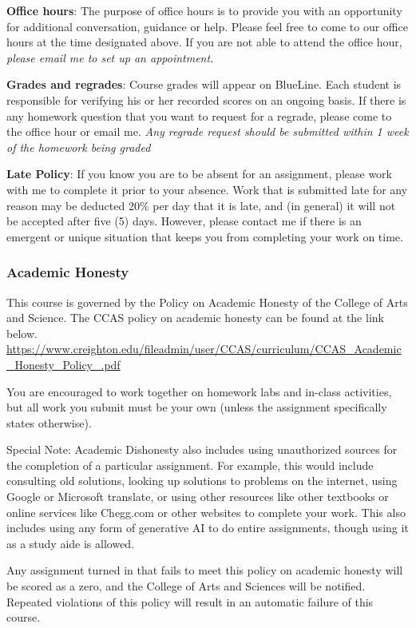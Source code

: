 \documentclass[
  11pt,
  letterpaper,
  DIV=11,
  numbers=noendperiod]{scrartcl}
\begin{document}
\textbf{Office hours}: The purpose of office hours is to provide you
with an opportunity for additional conversation, guidance or help.
Please feel free to come to our office hours at the time designated
above. If you are not able to attend the office hour, \emph{please email
me to set up an appointment}.

\textbf{Grades and regrades}: Course grades will appear on BlueLine.
Each student is responsible for verifying his or her recorded scores on
an ongoing basis. If there is any homework question that you want to
request for a regrade, please come to the office hour or email me.
\emph{Any regrade request should be submitted within 1 week of the
homework being graded}

\textbf{Late Policy}: If you know you are to be absent for an
assignment, please work with me to complete it prior to your absence.
Work that is submitted late for any reason may be deducted 20\% per day
that it is late, and (in general) it will not be accepted after five (5)
days. However, please contact me if there is an emergent or unique
situation that keeps you from completing your work on time.

\subsubsection{Academic Honesty}\label{academic-honesty}

This course is governed by the Policy on Academic Honesty of the College
of Arts and Science. The CCAS policy on academic honesty can be found at
the link below.
\url{https://www.creighton.edu/fileadmin/user/CCAS/curriculum/CCAS\_Academic\_Honesty\_Policy\_.pdf}

You are encouraged to work together on homework labs and in-class
activities, but all work you submit must be your own (unless the
assignment specifically states otherwise).

Special Note: Academic Dishonesty also includes using unauthorized
sources for the completion of a particular assignment. For example, this
would include consulting old solutions, looking up solutions to problems
on the internet, using Google or Microsoft translate, or using other
resources like other textbooks or online services like Chegg.com or
other websites to complete your work. This also includes using any form
of generative AI to do entire assignments, though using it as a study
aide is allowed.

Any assignment turned in that fails to meet this policy on academic
honesty will be scored as a zero, and the College of Arts and Sciences
will be notified. Repeated violations of this policy will result in an
automatic failure of this course.
\end{document}
